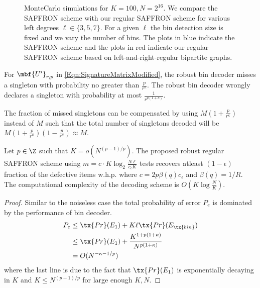 \documentclass[conference,twocolumn]{IEEEtran}
\newcommand*{\FigPath}{../Figures}
\def\ceps{c_{\epsilon}}
\begin{document}

\begin{figure}[t!]
\centering
\resizebox{\columnwidth}{!}{}
\caption{MonteCarlo simulations for $K=100, N=2^{16}$. We compare the SAFFRON scheme with our regular SAFFRON scheme for various left degrees $\ell\in\{3,5,7\}$. For a given $\ell$ the bin detection size is fixed and we vary the number of bins. The plots in blue indicate the SAFFRON scheme and the plots in red indicate our regular SAFFRON scheme based on left-and-right-regular bipartite graphs.}
\label{Fig:SimulationNoiseless}
\end{figure}

\begin{lemma}
For $\mbf{U'}_{r,p}$ in \eqref{Eqn:SignatureMatrixModified}, the robust bin decoder misses a singleton with probability no greater than $\frac{p}{r^{\kappa}}$. The robust bin decoder wrongly declares a singleton with probability at most $\frac{1}{r^{p(1+\kappa)}}$.
\end{lemma}
The fraction of missed singletons can be compensated by using $M(1+\frac{p}{r^{\kappa}})$ instead of $M$ such that the total number of singletons decoded will be $M(1+\frac{p}{r^{\kappa}})(1-\frac{p}{r^{\kappa}})\approx M$.

\begin{theorem}
Let $p\in\Z$ such that $K=o\left(N^{(p-1)/p}\right)$. The proposed robust regular SAFFRON scheme using $m=c\cdot K \log_{2}\frac{N\ell}{\ceps K}$ tests recovers atleast $(1-\epsilon)$ fraction of the defective items w.h.p. where $c=2p\beta(q)\ceps$ and $\beta(q)=1/R$. The computational complexity of the decoding scheme is $O(K\log \frac{N}{K})$.
\end{theorem}
\begin{proof}
Similar to the noiseless case the total probability of error $P_e$ is dominated by the performance of bin decoder.
\begin{align*}
P_e &\leq  \tx{Pr}(E_1)+ K\ell \tx{ Pr}(E_{\tx{bin}})\\
               &\leq \tx{Pr}(E_1)+ \frac{K^{1+p(1+\kappa)}}{N^{p(1+\kappa)}}\\
               &=O(N^{-\kappa-1/p})
\end{align*}
where the last line is due to the fact that $\tx{Pr}(E_1)$ is exponentially decaying in $K$ and $K\leq N^{(p-1)/p}$ for large enough $K,N$.
\end{proof}
\end{document}
